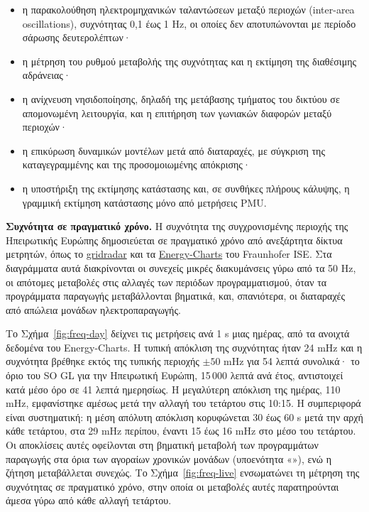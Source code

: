 \begin{itemize}
\item η παρακολούθηση ηλεκτρομηχανικών ταλαντώσεων μεταξύ περιοχών (inter-area
      oscillations), συχνότητας 0,1 έως 1 Hz, οι οποίες δεν αποτυπώνονται με περίοδο
      σάρωσης δευτερολέπτων·
\item η μέτρηση του ρυθμού μεταβολής της συχνότητας και η εκτίμηση της διαθέσιμης
      αδράνειας·
\item η ανίχνευση νησιδοποίησης, δηλαδή της μετάβασης τμήματος του δικτύου σε απομονωμένη
      λειτουργία, και η επιτήρηση των γωνιακών διαφορών μεταξύ περιοχών·
\item η επικύρωση δυναμικών μοντέλων μετά από διαταραχές, με σύγκριση της καταγεγραμμένης
      και της προσομοιωμένης απόκρισης·
\item η υποστήριξη της εκτίμησης κατάστασης και, σε συνθήκες πλήρους κάλυψης, η
      γραμμική εκτίμηση κατάστασης μόνο από μετρήσεις PMU.
\end{itemize}

\textbf{Συχνότητα σε πραγματικό χρόνο.} Η συχνότητα της συγχρονισμένης περιοχής της
Ηπειρωτικής Ευρώπης δημοσιεύεται σε πραγματικό χρόνο από ανεξάρτητα δίκτυα μετρητών, όπως το
\href{https://gridradar.net/en/mains-frequency}{gridradar} και τα
\href{https://www.energy-charts.info/charts/frequency/chart.htm?l=en}{Energy-Charts} του
Fraunhofer ISE. Στα διαγράμματα αυτά διακρίνονται οι συνεχείς μικρές διακυμάνσεις γύρω από τα
50 Hz, οι απότομες μεταβολές στις αλλαγές των περιόδων προγραμματισμού, όταν τα προγράμματα
παραγωγής μεταβάλλονται βηματικά, και, σπανιότερα, οι διαταραχές από απώλεια μονάδων
ηλεκτροπαραγωγής.

Το Σχήμα~\ref{fig:freq-day} δείχνει τις μετρήσεις ανά 1 s μιας ημέρας, από τα ανοιχτά
δεδομένα του Energy-Charts. Η τυπική απόκλιση της συχνότητας ήταν 24 mHz και η συχνότητα
βρέθηκε εκτός της τυπικής περιοχής $\pm 50$ mHz για 54 λεπτά συνολικά· το όριο του SO GL για
την Ηπειρωτική Ευρώπη, 15\,000 λεπτά ανά έτος, αντιστοιχεί κατά μέσο όρο σε 41 λεπτά ημερησίως.
Η μεγαλύτερη απόκλιση της ημέρας, 110 mHz, εμφανίστηκε αμέσως μετά την αλλαγή του τετάρτου
στις 10:15. Η συμπεριφορά είναι συστηματική: η μέση απόλυτη απόκλιση κορυφώνεται 30 έως 60 s
μετά την αρχή κάθε τετάρτου, στα 29 mHz περίπου, έναντι 15 έως 16 mHz στο μέσο του τετάρτου.
Οι αποκλίσεις αυτές οφείλονται στη βηματική μεταβολή των προγραμμάτων παραγωγής στα όρια των
αγοραίων χρονικών μονάδων (υποενότητα «»), ενώ η ζήτηση μεταβάλλεται συνεχώς.
Το Σχήμα~\ref{fig:freq-live} ενσωματώνει τη μέτρηση της συχνότητας σε πραγματικό χρόνο, στην
οποία οι μεταβολές αυτές παρατηρούνται άμεσα γύρω από κάθε αλλαγή τετάρτου.


